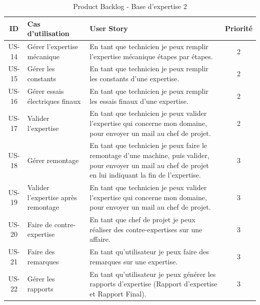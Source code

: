 \documentclass[11pt,a4paper]{article}
\begin{document}
\newpage
\begin{table}[H]
\centering
\begin{tabular}{|c|p{5cm}|p{8cm}|c|}
\hline
\textbf{ID} & \textbf{Cas d'utilisation} & \textbf{User Story} & \textbf{Priorité} \\
\hline

US-14 & Gérer l'expertise mécanique & En tant que technicien je peux remplir l’expertise mécanique étapes par étapes. & 2 \\
\hline
US-15 & Gérer les constants & En tant que technicien je peux remplir les constants d'une expertise. & 2 \\
\hline
US-16 & Gérer essais électriques finaux & En tant que technicien je peux remplir les essais finaux d'une expertise. & 2 \\
\hline
US-17 & Valider l’expertise & En tant que technicien je peux valider l’expertise qui concerne mon domaine, pour envoyer un mail au chef de projet. & 2 \\
\hline
US-18 & Gérer remontage & En tant que technicien je peux faire le remontage d’une machine, puis valider, pour envoyer un mail au chef de projet en lui indiquant la fin de l’expertise. & 3 \\
\hline
US-19 & Valider l’expertise après remontage & En tant que technicien je peux valider l’expertise qui concerne mon domaine, pour envoyer un mail au chef de projet. & 3 \\
\hline
US-20 & Faire de contre-expertise & En tant que chef de projet je peux réaliser des contre-expertises sur une affaire. & 3 \\
\hline
US-21 & Faire des remarques & En tant qu’utilisateur je peux faire des remarques sur une expertise. & 3 \\
\hline
US-22 & Gérer les rapports & En tant qu’utilisateur je peux générer les rapports d'expertise (Rapport d'expertise et Rapport Final). & 3 \\
\hline
\end{tabular}
\caption{Product Backlog - Base d'expertise 2}
\end{table}


\newpage
\end{document}
